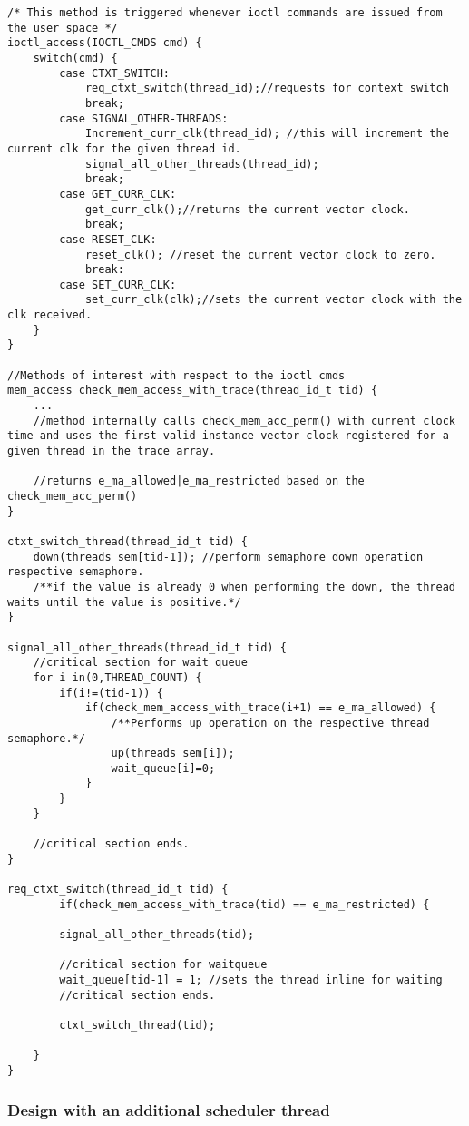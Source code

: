 \begin{lstlisting}[title=Kernel Space - IOCTL, style=customc]
/* This method is triggered whenever ioctl commands are issued from the user space */
ioctl_access(IOCTL_CMDS cmd) {	
	switch(cmd) {
		case CTXT_SWITCH: 
			req_ctxt_switch(thread_id);//requests for context switch
			break;
		case SIGNAL_OTHER-THREADS:
			Increment_curr_clk(thread_id); //this will increment the current clk for the given thread id.
			signal_all_other_threads(thread_id);
			break;
		case GET_CURR_CLK:
			get_curr_clk();//returns the current vector clock.
			break;
		case RESET_CLK:
			reset_clk(); //reset the current vector clock to zero.
			break:		
		case SET_CURR_CLK:
			set_curr_clk(clk);//sets the current vector clock with the clk received.
	}
}

//Methods of interest with respect to the ioctl cmds
mem_access check_mem_access_with_trace(thread_id_t tid) {
	...
	//method internally calls check_mem_acc_perm() with current clock time and uses the first valid instance vector clock registered for a given thread in the trace array.
		
	//returns e_ma_allowed|e_ma_restricted based on the check_mem_acc_perm()
}

ctxt_switch_thread(thread_id_t tid) {	
	down(threads_sem[tid-1]); //perform semaphore down operation respective semaphore.
	/**if the value is already 0 when performing the down, the thread waits until the value is positive.*/
}

signal_all_other_threads(thread_id_t tid) {
	//critical section for wait queue
	for i in(0,THREAD_COUNT) {
		if(i!=(tid-1)) {
			if(check_mem_access_with_trace(i+1) == e_ma_allowed) {
				/**Performs up operation on the respective thread semaphore.*/
				up(threads_sem[i]);
				wait_queue[i]=0;			
			}		
		}
	}	
	
	//critical section ends.
}

req_ctxt_switch(thread_id_t tid) {
		if(check_mem_access_with_trace(tid) == e_ma_restricted) {

		signal_all_other_threads(tid);
		
		//critical section for waitqueue
		wait_queue[tid-1] = 1; //sets the thread inline for waiting
		//critical section ends.
		
		ctxt_switch_thread(tid);

	}
}

\end{lstlisting}

\subsubsection{Design with an additional scheduler thread}\label{sec_add_thread}

